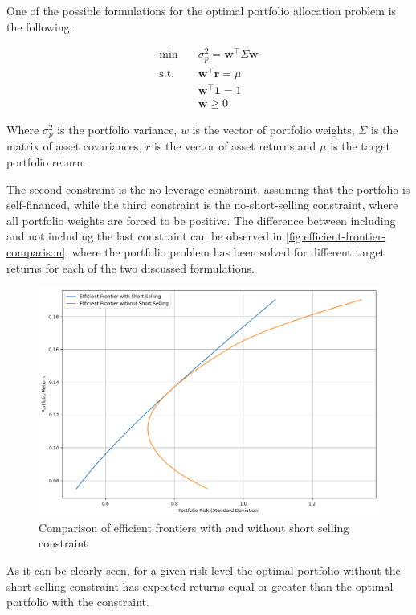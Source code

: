 One of the possible formulations for the optimal portfolio allocation problem is the following:

$$
\begin{aligned}
    \text{min} \quad & \sigma_p^2 = \mathbf{w}^\top \Sigma \mathbf{w} \\
    \text{s.t.} \quad & \mathbf{w}^\top \mathbf{r} = \mu \\
    & \mathbf{w}^\top \mathbf{1} = 1 \\
    & \mathbf{w} \geq 0
\end{aligned}
$$


Where $\sigma_p^2$ is the portfolio variance, $w$ is the vector of portfolio weights, $\Sigma$ is the matrix of asset covariances, $r$ is the vector of asset returns and $\mu$ is the target portfolio return. 

The second constraint is the no-leverage constraint, assuming that the portfolio is self-financed, while the third constraint is the no-short-selling constraint, where all portfolio weights are forced to be positive. 
The difference between including and not including the last constraint can be observed in \autoref{fig:efficient-frontier-comparison}, where the portfolio problem has been solved for different target returns for each of the two discussed formulations. 

\begin{figure}[h]
    \includegraphics[width=\linewidth]{assets/efficient-frontier-comparison.png}
    \caption{Comparison of efficient frontiers with and without short selling constraint}
    \label{fig:efficient-frontier-comparison}
\end{figure}

As it can be clearly seen, for a given risk level the optimal portfolio without the short selling constraint has expected returns equal or greater than the optimal portfolio with the constraint. 

